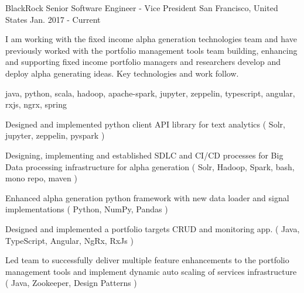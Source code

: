 \cventry
    {BlackRock} %
    {Senior Software Engineer - Vice President} %
    {San Francisco, United States} %
    {Jan. 2017 - Current} %
    {
    \begin{cvitems} %
        I am working with the fixed income alpha generation technologies team and have previously worked with the portfolio management tools team building,
    enhancing and supporting fixed income portfolio managers and researchers develop and deploy alpha generating ideas. Key technologies and work follow.
        \item { java, python, scala, hadoop, apache-spark, jupyter, zeppelin, typescript, angular, rxjs, ngrx, spring }
        \item { Designed and implemented python client API library for text analytics ( Solr, jupyter, zeppelin, pyspark )}
        \item { Designing, implementing and established SDLC and CI/CD processes for Big Data processing infrastructure for alpha generation ( Solr, Hadoop, Spark,
        bash, mono repo, maven ) }
        \item { Enhanced alpha generation python framework with new data loader and signal implementations ( Python, NumPy, Pandas )}
        \item { Designed and implemented a portfolio targets CRUD and monitoring app. ( Java, TypeScript, Angular, NgRx, RxJs )  }
        \item { Led team to successfully deliver multiple feature enhancements to the portfolio management tools and implement dynamic auto scaling of services
        infrastructure ( Java, Zookeeper, Design Patterns )}
    \end{cvitems}
    }





